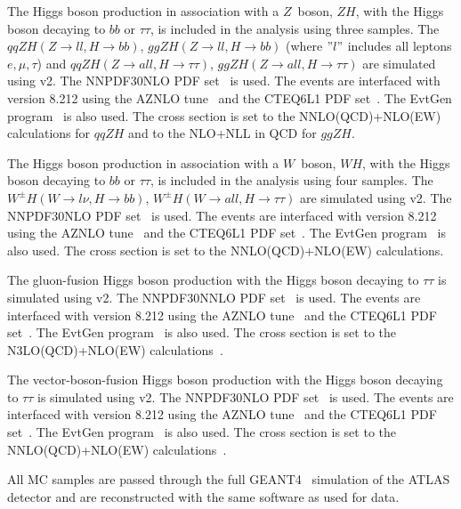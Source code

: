 The Higgs boson production in association with a $Z$\ boson, $ZH$, with the Higgs boson decaying to $bb$ or $\tau\tau$, is included in the analysis using three samples. The $qq ZH(Z\rightarrow ll, H\rightarrow bb)$, $gg ZH(Z\rightarrow ll,H\rightarrow bb)$ (where $"l"$ includes all leptons $e,\mu,\tau$) and $qq ZH(Z\rightarrow all, H\rightarrow \tau\tau)$, $gg ZH(Z\rightarrow all, H\rightarrow \tau\tau)$ are simulated using \POWHEGBOX v2. The NNPDF30NLO PDF set~\cite{NNPDF} is used. The events are interfaced with  version 8.212 using the AZNLO tune~\cite{AZNLOtune} and the CTEQ6L1 PDF set~\cite{CTEQ6L1}. The EvtGen program~\cite{EvtGen} is also used. The cross section is set to the NNLO(QCD)+NLO(EW) calculations for $qqZH$ and to the NLO+NLL in QCD for $ggZH$. 

The Higgs boson production in association with a $W$\ boson, $WH$, with the Higgs boson decaying to $bb$ or $\tau\tau$, is included in the analysis using four samples. The $W^{\pm}H(W\rightarrow l \nu, H\rightarrow bb)$, $W^{\pm}H(W\rightarrow all,H\rightarrow \tau\tau)$ are simulated using \POWHEGBOX v2. The NNPDF30NLO PDF set~\cite{NNPDF} is used. The events are interfaced with  version 8.212 using the AZNLO tune~\cite{AZNLOtune} and the CTEQ6L1 PDF set~\cite{CTEQ6L1}. The EvtGen program~\cite{EvtGen} is also used. The cross section is set to the NNLO(QCD)+NLO(EW) calculations.

The gluon-fusion Higgs boson production with the Higgs boson decaying to $\tau\tau$ is simulated using \POWHEGBOX v2. The NNPDF30NNLO PDF set~\cite{NNPDF} is used. The events are interfaced with  version 8.212 using the AZNLO tune~\cite{AZNLOtune} and the CTEQ6L1 PDF set~\cite{CTEQ6L1}. The EvtGen program~\cite{EvtGen} is also used. The cross section is set to the N3LO(QCD)+NLO(EW) calculations~\cite{Hxsec}.

The vector-boson-fusion Higgs boson production with the Higgs boson decaying to $\tau\tau$ is simulated using \POWHEGBOX v2. The NNPDF30NLO PDF set~\cite{NNPDF} is used. The events are interfaced with  version 8.212 using the AZNLO tune~\cite{AZNLOtune} and the CTEQ6L1 PDF set~\cite{CTEQ6L1}. The EvtGen program~\cite{EvtGen} is also used. The cross section is set to the NNLO(QCD)+NLO(EW) calculations~\cite{Hxsec}. 



All MC samples are passed through the full GEANT4~\cite{Geant4,ATLASSIM} simulation of the ATLAS detector and are reconstructed with the same software as used for data.

